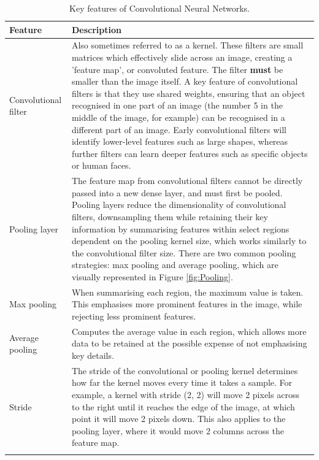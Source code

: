 \documentclass[12pt]{report}
\begin{document}
\begin{longtable}{ | p{} | p{} | }
    \hline
    \cellcolor{blue!25} Feature & \cellcolor{blue!25} Description \\
    \hline
    Convolutional filter & Also sometimes referred to as a kernel. These filters are small matrices which effectively slide across 
    an image, creating a 'feature map', or convoluted feature. The filter \textbf{must} be smaller than the image itself. 
    A key feature of convolutional filters is that they use shared weights, ensuring that an object recognised in one part of an image 
    (the number 5 in the middle of the image, for example) can be recognised in a different part of an image. Early convolutional filters 
    will identify lower-level features such as large shapes, whereas further filters can learn deeper features such as specific objects 
    or human faces. \\
    \hline 
    Pooling layer & The feature map from convolutional filters cannot be directly passed into a new dense layer, and must first be 
    pooled. Pooling layers reduce the dimensionality of convolutional filters, downsampling them while retaining their key information
    by summarising features within select regions dependent on the pooling kernel size, which works similarly to the convolutional filter 
    size. There are two common pooling strategies: max pooling and average pooling, which are visually represented in Figure \ref{fig:Pooling}. \\
    \hline 
    Max pooling & When summarising each region, the maximum value is taken. This emphasises more prominent features in the image,
    while rejecting less prominent features. \\
    \hline 
    Average pooling & Computes the average value in each region, which allows more data to be retained at the possible expense of 
    not emphasising key details. \\
    \hline
    Stride & The stride of the convolutional or pooling kernel determines how far the kernel moves every time it takes a sample. 
    For example, a kernel with stride (2, 2) will move 2 pixels across to the right until it reaches the edge of the image, at which 
    point it will move 2 pixels down. This also applies to the pooling layer, where it would move 2 columns across the feature map. \\
    \hline
    \caption{Key features of Convolutional Neural Networks.}\label{tab:CNNFeatures}
\end{longtable}
\end{document}
